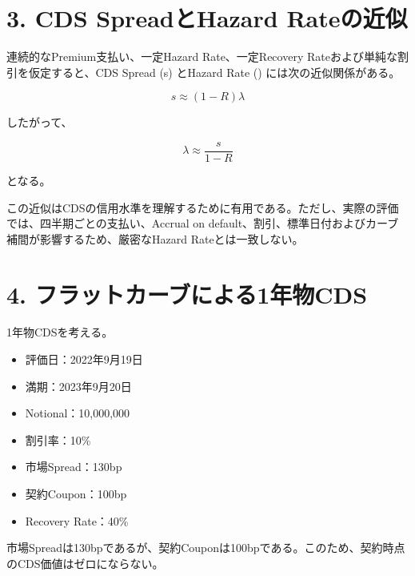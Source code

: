 \documentclass[
  letterpaper,
  DIV=11,
  numbers=noendperiod]{scrreprt}
\providecommand{\tightlist}{%
  \setlength{\itemsep}{0pt}\setlength{\parskip}{0pt}}
\begin{document}
\section{3. CDS SpreadとHazard
Rateの近似}\label{cds-spreadux3068hazard-rateux306eux8fd1ux4f3c}

連続的なPremium支払い、一定Hazard Rate、一定Recovery
Rateおよび単純な割引を仮定すると、CDS Spread (s) とHazard Rate (\lambda)
には次の近似関係がある。

\[
s
\approx
(1-R)\lambda
\]

したがって、

\[
\lambda
\approx
\frac{s}{1-R}
\]

となる。

この近似はCDSの信用水準を理解するために有用である。ただし、実際の評価では、四半期ごとの支払い、Accrual
on default、割引、標準日付およびカーブ補間が影響するため、厳密なHazard
Rateとは一致しない。

\section{4.
フラットカーブによる1年物CDS}\label{ux30d5ux30e9ux30c3ux30c8ux30abux30fcux30d6ux306bux3088ux308b1ux5e74ux7269cds}

1年物CDSを考える。

\begin{itemize}
\tightlist
\item
  評価日：2022年9月19日
\item
  満期：2023年9月20日
\item
  Notional：10,000,000
\item
  割引率：10\%
\item
  市場Spread：130bp
\item
  契約Coupon：100bp
\item
  Recovery Rate：40\%
\end{itemize}

市場Spreadは130bpであるが、契約Couponは100bpである。このため、契約時点のCDS価値はゼロにならない。
\end{document}
